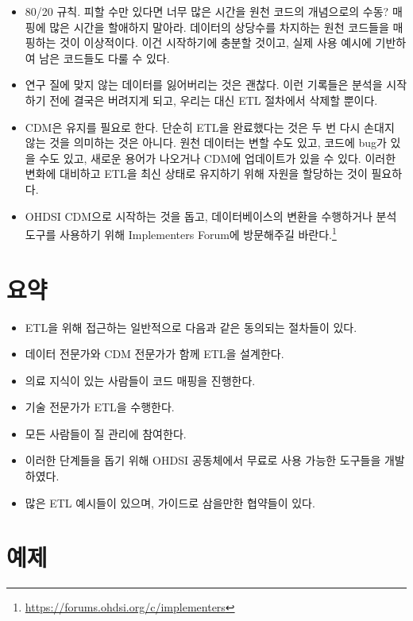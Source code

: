 \documentclass[11pt]{book}
\providecommand{\tightlist}{%
  \setlength{\itemsep}{0pt}\setlength{\parskip}{0pt}}
\let\rmarkdownfootnote\footnote%
\def\footnote{\protect\rmarkdownfootnote}
\theoremstyle{definition}
\theoremstyle{definition}
\theoremstyle{definition}
\theoremstyle{remark}
\let\BeginKnitrBlock\begin \let\EndKnitrBlock\end
\begin{document}
\begin{itemize}
\tightlist
\item
  80/20 규칙. 피할 수만 있다면 너무 많은 시간을 원천 코드의 개념으로의
  수동? 매핑에 많은 시간을 할애하지 말아라. 데이터의 상당수를 차지하는
  원천 코드들을 매핑하는 것이 이상적이다. 이건 시작하기에 충분할 것이고,
  실제 사용 예시에 기반하여 남은 코드들도 다룰 수 있다.
\item
  연구 질에 맞지 않는 데이터를 잃어버리는 것은 괜찮다. 이런 기록들은
  분석을 시작하기 전에 결국은 버려지게 되고, 우리는 대신 ETL 절차에서
  삭제할 뿐이다.
\item
  CDM은 유지를 필요로 한다. 단순히 ETL을 완료했다는 것은 두 번 다시
  손대지 않는 것을 의미하는 것은 아니다. 원천 데이터는 변할 수도 있고,
  코드에 bug가 있을 수도 있고, 새로운 용어가 나오거나 CDM에 업데이트가
  있을 수 있다. 이러한 변화에 대비하고 ETL을 최신 상태로 유지하기 위해
  자원을 할당하는 것이 필요하다.
\item
  OHDSI CDM으로 시작하는 것을 돕고, 데이터베이스의 변환을 수행하거나
  분석 도구를 사용하기 위해 Implementers Forum에 방문해주길
  바란다.\footnote{\url{https://forums.ohdsi.org/c/implementers}}
\end{itemize}

\section{요약}\label{-4}

\BeginKnitrBlock{rmdsummary}
\begin{itemize}
\item
  ETL을 위해 접근하는 일반적으로 다음과 같은 동의되는 절차들이 있다.
\item
  데이터 전문가와 CDM 전문가가 함께 ETL을 설계한다.
\item
  의료 지식이 있는 사람들이 코드 매핑을 진행한다.
\item
  기술 전문가가 ETL을 수행한다.
\item
  모든 사람들이 질 관리에 참여한다.
\item
  이러한 단계들을 돕기 위해 OHDSI 공동체에서 무료로 사용 가능한 도구들을
  개발하였다.
\item
  많은 ETL 예시들이 있으며, 가이드로 삼을만한 협약들이 있다.
\end{itemize}
\EndKnitrBlock{rmdsummary}

\section{예제}\label{-1}
\end{document}
